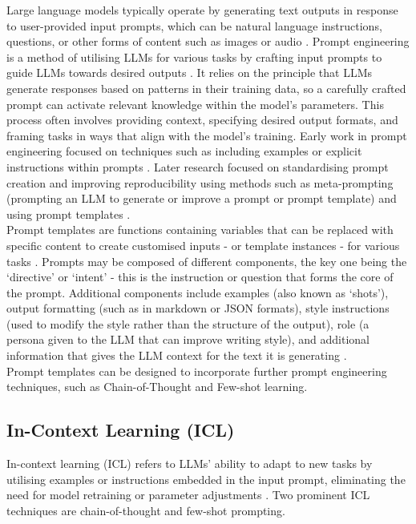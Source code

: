 Large language models typically operate by generating text outputs in response to user-provided input prompts, which can be natural language instructions, questions, or other forms of content such as images or audio \cite{schulhoff2024promptreportsystematicsurvey}. Prompt engineering is a method of utilising LLMs for various tasks by crafting input prompts to guide LLMs towards desired outputs \cite{schulhoff2024promptreportsystematicsurvey}. It relies on the principle that LLMs generate responses based on patterns in their training data, so a carefully crafted prompt can activate relevant knowledge within the model's parameters. This process often involves providing context, specifying desired output formats, and framing tasks in ways that align with the model's training. Early work in prompt engineering focused on techniques such as including examples or explicit instructions within prompts \cite{brown2020language}. Later research focused on standardising prompt creation and improving reproducibility using methods such as meta-prompting \cite{reynolds2021prompt, zhou2022large} (prompting an LLM to generate or improve a prompt or prompt template) and using prompt templates \cite{shin2020autoprompt}. \\

Prompt templates are functions containing variables that can be replaced with specific content to create customised inputs - or template instances - for various tasks \cite{shin2020autoprompt}. Prompts may be composed of different components, the key one being the `directive' or `intent' - this is the instruction or question that forms the core of the prompt. Additional components include examples (also known as `shots'), output formatting (such as in markdown or JSON formats), style instructions (used to modify the style rather than the structure of the output), role (a persona given to the LLM that can improve writing style), and additional information that gives the LLM context for the text it is generating \cite{schulhoff2024promptreportsystematicsurvey}.\\

Prompt templates can be designed to incorporate further prompt engineering techniques, such as Chain-of-Thought and Few-shot learning.


\subsection{In-Context Learning (ICL)} 

In-context learning (ICL) refers to LLMs' ability to adapt to new tasks by utilising examples or instructions embedded in the input prompt, eliminating the need for model retraining or parameter adjustments \cite{brown2020language}. Two prominent ICL techniques are chain-of-thought and few-shot prompting.\\

